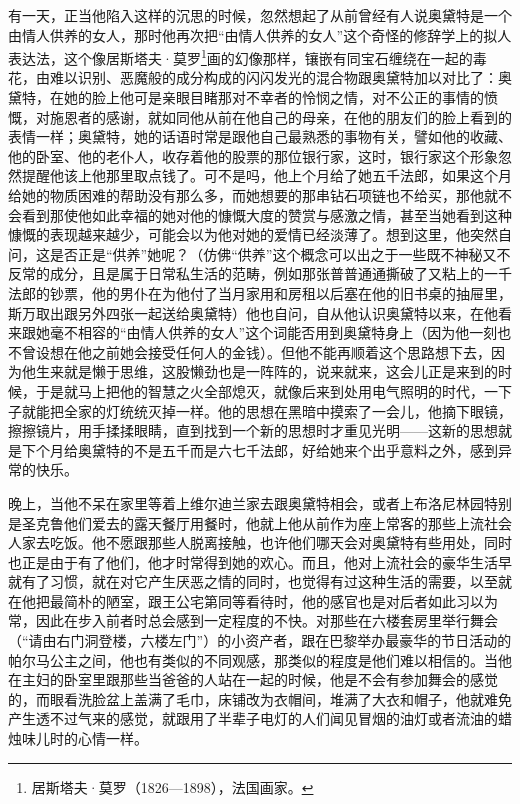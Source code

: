 \par 有一天，正当他陷入这样的沉思的时候，忽然想起了从前曾经有人说奥黛特是一个由情人供养的女人，那时他再次把“由情人供养的女人”这个奇怪的修辞学上的拟人表达法，这个像居斯塔夫·莫罗\footnote{居斯塔夫·莫罗（1826—1898），法国画家。}画的幻像那样，镶嵌有同宝石缠绕在一起的毒花，由难以识别、恶魔般的成分构成的闪闪发光的混合物跟奥黛特加以对比了：奥黛特，在她的脸上他可是亲眼目睹那对不幸者的怜悯之情，对不公正的事情的愤慨，对施恩者的感谢，就如同他从前在他自己的母亲，在他的朋友们的脸上看到的表情一样；奥黛特，她的话语时常是跟他自己最熟悉的事物有关，譬如他的收藏、他的卧室、他的老仆人，收存着他的股票的那位银行家，这时，银行家这个形象忽然提醒他该上他那里取点钱了。可不是吗，他上个月给了她五千法郎，如果这个月给她的物质困难的帮助没有那么多，而她想要的那串钻石项链也不给买，那他就不会看到那使他如此幸福的她对他的慷慨大度的赞赏与感激之情，甚至当她看到这种慷慨的表现越来越少，可能会以为他对她的爱情已经淡薄了。想到这里，他突然自问，这是否正是“供养”她呢？（仿佛“供养”这个概念可以出之于一些既不神秘又不反常的成分，且是属于日常私生活的范畴，例如那张普普通通撕破了又粘上的一千法郎的钞票，他的男仆在为他付了当月家用和房租以后塞在他的旧书桌的抽屉里，斯万取出跟另外四张一起送给奥黛特）他也自问，自从他认识奥黛特以来，在他看来跟她毫不相容的“由情人供养的女人”这个词能否用到奥黛特身上（因为他一刻也不曾设想在他之前她会接受任何人的金钱）。但他不能再顺着这个思路想下去，因为他生来就是懒于思维，这股懒劲也是一阵阵的，说来就来，这会儿正是来到的时候，于是就马上把他的智慧之火全部熄灭，就像后来到处用电气照明的时代，一下子就能把全家的灯统统灭掉一样。他的思想在黑暗中摸索了一会儿，他摘下眼镜，擦擦镜片，用手揉揉眼睛，直到找到一个新的思想时才重见光明——这新的思想就是下个月给奥黛特的不是五千而是六七千法郎，好给她来个出乎意料之外，感到异常的快乐。
\par 晚上，当他不呆在家里等着上维尔迪兰家去跟奥黛特相会，或者上布洛尼林园特别是圣克鲁他们爱去的露天餐厅用餐时，他就上他从前作为座上常客的那些上流社会人家去吃饭。他不愿跟那些人脱离接触，也许他们哪天会对奥黛特有些用处，同时也正是由于有了他们，他才时常得到她的欢心。而且，他对上流社会的豪华生活早就有了习惯，就在对它产生厌恶之情的同时，也觉得有过这种生活的需要，以至就在他把最简朴的陋室，跟王公宅第同等看待时，他的感官也是对后者如此习以为常，因此在步入前者时总会感到一定程度的不快。对那些在六楼套房里举行舞会（“请由右门洞登楼，六楼左门”）的小资产者，跟在巴黎举办最豪华的节日活动的帕尔马公主之间，他也有类似的不同观感，那类似的程度是他们难以相信的。当他在主妇的卧室里跟那些当爸爸的人站在一起的时候，他是不会有参加舞会的感觉的，而眼看洗脸盆上盖满了毛巾，床铺改为衣帽间，堆满了大衣和帽子，他就难免产生透不过气来的感觉，就跟用了半辈子电灯的人们闻见冒烟的油灯或者流油的蜡烛味儿时的心情一样。
